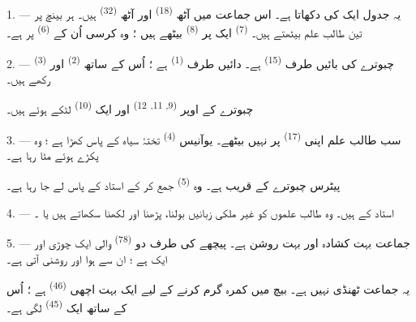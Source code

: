 \VUsaut{2.0mm}
\VUsaut{3.2mm}
\VUsaut{2.6mm}
\VUsaut{3.4mm}
\VUornamento{9pt}
\VUsaut{5.0mm}
\VUsaut{3.0mm}
\VUfilet{16mm}
\VUsaut{5.6mm}

\VUsaut{1.4mm}
\VUsaut{2.2mm}
\VUfilet{20mm}
\VUsaut{6.4mm}

\VUsaut{3.0mm}

1. --- یہ جدول ایک  کی  دکھاتا ہے۔ اس
جماعت میں آٹھ  \textsuperscript{(18)} اور آٹھ
 \textsuperscript{(32)} ہیں۔ ہر بینچ پر تین طالب علم
بیٹھتے ہیں۔  \textsuperscript{(7)} ایک  پر
\textsuperscript{(8)} بیٹھے ہیں ؛ وہ کرسی اُن کے 
\textsuperscript{(6)} پر ہے۔

2. --- چبوترے کی بائیں طرف  \textsuperscript{(15)}
ہے۔ دائیں طرف  \textsuperscript{(1)} ہے ؛ اُس کے ساتھ
 \textsuperscript{(2)} اور  \textsuperscript{(3)}
رکھے ہیں۔

چبوترے کے اوپر  \textsuperscript{(9, 11,}
\textsuperscript{12)} اور ایک  \textsuperscript{(10)}
لٹکے ہوئے ہیں۔

3. --- سب طالب علم اپنی  \textsuperscript{(17)} پر نہیں
بیٹھے۔ یوآنیس \textsuperscript{(4)} تختۂ سیاہ کے پاس کھڑا ہے ؛ وہ
 پکڑے ہوئے  مٹا رہا ہے۔

پیٹرس چبوترے کے قریب ہے۔ وہ  \textsuperscript{(5)}
جمع کر کے استاد کے پاس لے جا رہا ہے۔

4. ---  استاد  کے ہیں۔ وہ طالب علموں کو
غیر ملکی زبانیں بولنا، پڑھنا اور لکھنا سکھاتے ہیں  یا ۔

5. --- جماعت بہت کشادہ اور بہت روشن ہے۔ پیچھے کی طرف دو
 \textsuperscript{(78)} والی ایک چوڑی 
اور ایک  ہے ؛ ان سے ہوا اور روشنی آتی ہے۔

یہ جماعت ٹھنڈی نہیں ہے۔ بیچ میں کمرہ گرم کرنے کے لیے ایک بہت اچھی
 \textsuperscript{(46)} ہے ؛ اُس کے ساتھ ایک
 \textsuperscript{(45)} لگی ہے۔

